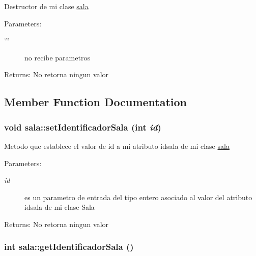Destructor de mi clase \hyperlink{classsala}{sala} \begin{Desc}
\item[Parameters:]
\begin{description}
\item[{\em \char`\"{}\char`\"{}}]no recibe parametros \end{description}
\end{Desc}
\begin{Desc}
\item[Returns:]No retorna ningun valor \end{Desc}


\subsection{Member Function Documentation}
\hypertarget{classsala_6e2f990c9e2b6fe2c08ba3853e5299c4}{
\subsubsection[setIdentificadorSala]{\setlength{\rightskip}{0pt plus 5cm}void sala::setIdentificadorSala (int {\em id})}}
\label{classsala_6e2f990c9e2b6fe2c08ba3853e5299c4}


Metodo que establece el valor de id a mi atributo idsala de mi clase \hyperlink{classsala}{sala} \begin{Desc}
\item[Parameters:]
\begin{description}
\item[{\em id}]es un parametro de entrada del tipo entero asociado al valor del atributo idsala de mi clase Sala \end{description}
\end{Desc}
\begin{Desc}
\item[Returns:]No retorna ningun valor \end{Desc}
\hypertarget{classsala_d6eb9a00920ec3f7eee7134d478ddf76}{
\subsubsection[getIdentificadorSala]{\setlength{\rightskip}{0pt plus 5cm}int sala::getIdentificadorSala ()}}
\label{classsala_d6eb9a00920ec3f7eee7134d478ddf76}


